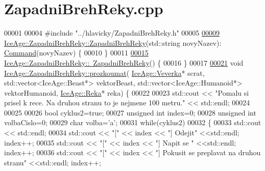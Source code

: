 \hypertarget{ZapadniBrehReky_8cpp_source}{}\section{Zapadni\+Breh\+Reky.\+cpp}
\label{ZapadniBrehReky_8cpp_source}

\begin{DoxyCode}
00001 
00004 \textcolor{preprocessor}{#include "../hlavicky/ZapadniBrehReky.h"}
00005 
\hypertarget{ZapadniBrehReky_8cpp_source.tex_l00009}{}\hyperlink{classIceAge_1_1ZapadniBrehReky_a6dd8484635c7a223f40920049350f832}{00009} \hyperlink{classIceAge_1_1ZapadniBrehReky_a6dd8484635c7a223f40920049350f832}{IceAge::ZapadniBrehReky::ZapadniBrehReky}(std::string novyNazev):
      \hyperlink{classIceAge_1_1Command}{Command}(novyNazev) \{
00010 \}
00011 
\hypertarget{ZapadniBrehReky_8cpp_source.tex_l00015}{}\hyperlink{classIceAge_1_1ZapadniBrehReky_a00e86d8cc5275a89beba1612f6075bd6}{00015} \hyperlink{classIceAge_1_1ZapadniBrehReky_a00e86d8cc5275a89beba1612f6075bd6}{IceAge::ZapadniBrehReky::~ZapadniBrehReky}() \{
00016 \}
00017 
\hypertarget{ZapadniBrehReky_8cpp_source.tex_l00021}{}\hyperlink{classIceAge_1_1ZapadniBrehReky_a656271d79b585a10278692815523558c}{00021} \textcolor{keywordtype}{void} \hyperlink{classIceAge_1_1ZapadniBrehReky_a656271d79b585a10278692815523558c}{IceAge::ZapadniBrehReky::prozkoumat}(
      \hyperlink{classIceAge_1_1Veverka}{IceAge::Veverka}* scrat, std::vector<IceAge::Beast*> vektorBeast, 
      std::vector<IceAge::Humanoid*> vektorHumanoid, \hyperlink{classIceAge_1_1Reka}{IceAge::Reka}* reka) \{
00022 
00023     std::cout << \textcolor{stringliteral}{"Pomalu si prisel k rece. Na druhou stranu to je nejmene 100 metru."} << std::endl;
00024 
00025 
00026     \textcolor{keywordtype}{bool} cyklus2=\textcolor{keyword}{true};
00027     \textcolor{keywordtype}{unsigned} \textcolor{keywordtype}{int} index=0;
00028     \textcolor{keywordtype}{unsigned} \textcolor{keywordtype}{int} volbaCislo=0;
00029     \textcolor{keywordtype}{char} volba=\textcolor{charliteral}{'a'};
00031     \textcolor{keywordflow}{while}(cyklus2)
00032         \{
00033             std::cout << std::endl;
00034             std::cout << \textcolor{stringliteral}{"["} << index << \textcolor{stringliteral}{"] Odejit"} <<std::endl; index++;
00035             std::cout << \textcolor{stringliteral}{"["} << index << \textcolor{stringliteral}{"] Napit se "} <<std::endl; index++;
00036             std::cout << \textcolor{stringliteral}{"["} << index << \textcolor{stringliteral}{"] Pokusit se preplavat na druhou stranu"} <<std::endl; index++;

\end{DoxyCode}
